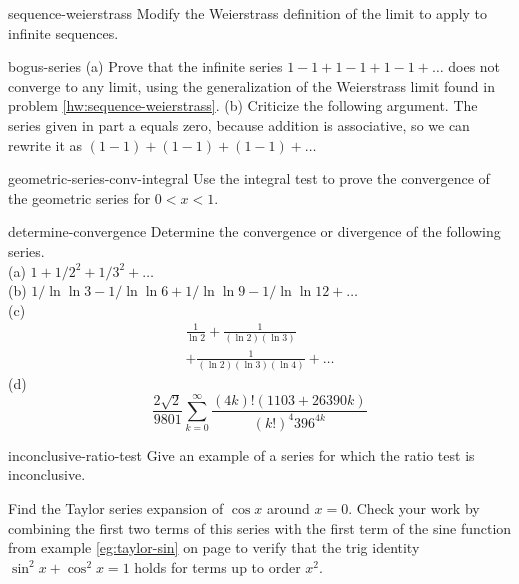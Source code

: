\begin{hwsection}


\begin{hwwithsoln}{sequence-weierstrass}
Modify the Weierstrass definition of the limit to apply to infinite sequences.
\end{hwwithsoln}

\begin{hwwithsoln}{bogus-series}
(a) Prove that the infinite series $1-1+1-1+1-1+\ldots$ does not converge to any limit, using the generalization
of the Weierstrass limit found in problem \ref{hw:sequence-weierstrass}.
(b) Criticize the following argument. The series given in part a equals zero, because addition is associative, so we can
rewrite it as $(1-1)+(1-1)+(1-1)+\ldots$
\end{hwwithsoln}

\begin{hwwithsoln}{geometric-series-conv-integral}
Use the integral test to prove the convergence of the geometric series for $0<x<1$.
\end{hwwithsoln}

\begin{hwwithsoln}{determine-convergence}
Determine the convergence or divergence of the following series.\\
(a) $1+1/2^2+1/3^2+\ldots$\\
(b) $1/\ln\ln 3-1/\ln\ln 6+1/\ln \ln 9-1/\ln\ln 12+\ldots$\\
(c)
\begin{multline*}
  \frac{1}{\ln 2} + \frac{1}{(\ln 2)(\ln 3)}  \\
            + \frac{1}{(\ln 2)(\ln 3)(\ln 4)} + \ldots
\end{multline*}
(d)
\begin{equation*}
\frac{2\sqrt{2}}{9801} \sum^\infty_{k=0} \frac{(4k)!(1103+26390k)}{(k!)^4 396^{4k}}
\end{equation*}
\end{hwwithsoln}

\begin{hwwithsoln}{inconclusive-ratio-test}
Give an example of a series for which the ratio test is inconclusive.
\end{hwwithsoln}

\begin{hw}
Find the Taylor series expansion of $\cos x$ around $x=0$. Check your work by combining the first two
terms of this series with the first term of the sine function from example \ref{eg:taylor-sin}
on page \pageref{eg:taylor-sin} to verify that the trig identity $\sin^2 x+\cos^2 x=1$ holds
for terms up to order $x^2$.
\end{hw}


\end{hwsection}
